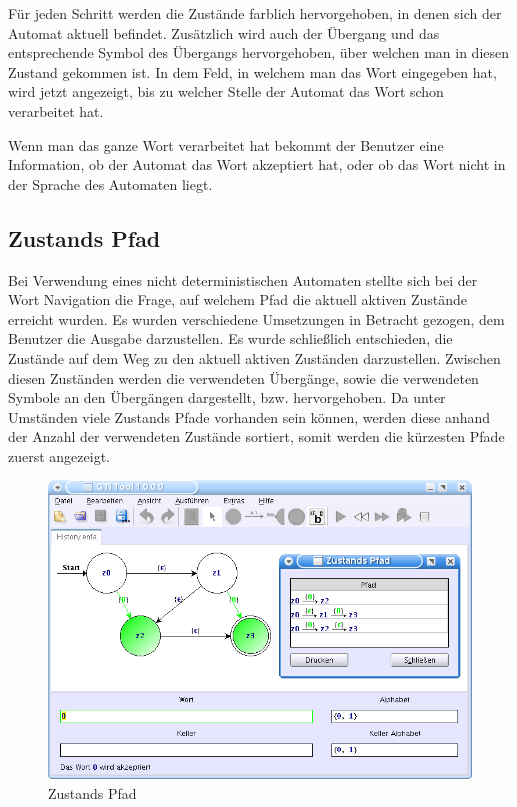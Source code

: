 Für jeden Schritt werden die Zustände farblich hervorgehoben, in denen sich der
Automat aktuell befindet. Zusätzlich wird auch der Übergang und das
entsprechende Symbol des Übergangs hervorgehoben, über welchen man in diesen
Zustand gekommen ist. In dem Feld, in welchem man das Wort eingegeben hat, wird
jetzt angezeigt, bis zu welcher Stelle der Automat das Wort schon verarbeitet
hat.\vspace{10pt}

Wenn man das ganze Wort verarbeitet hat bekommt der Benutzer eine Information,
ob der Automat das Wort akzeptiert hat, oder ob das Wort nicht in der Sprache
des Automaten liegt.\vspace{10pt}


\subsection{Zustands Pfad}

Bei Verwendung eines nicht deterministischen Automaten stellte sich bei der
Wort Navigation die Frage, auf welchem Pfad die aktuell aktiven Zustände
erreicht wurden. Es wurden verschiedene Umsetzungen in Betracht gezogen, dem
Benutzer die Ausgabe darzustellen. Es wurde schließlich entschieden, die
Zustände auf dem Weg zu den aktuell aktiven Zuständen darzustellen. Zwischen
diesen Zuständen werden die verwendeten Übergänge, sowie die verwendeten
Symbole an den Übergängen dargestellt, bzw. hervorgehoben. Da unter Umständen
viele Zustands Pfade vorhanden sein können, werden diese anhand der Anzahl der
verwendeten Zustände sortiert, somit werden die kürzesten Pfade zuerst
angezeigt.\vspace{10pt}

\begin{figure}[h!]
\begin{center}
\includegraphics[width=12cm]{../images/history_path.png}
\caption{Zustands Pfad}
\end{center}
\end{figure}

